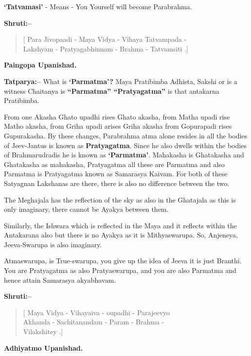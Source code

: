 \textbf{‘Tatvamasi’} - Means - You Yourself will become Parabrahma.

\textbf{Shruti:–}

\begin{verse}
[ Para Jivopaadi - Maya Vidya - Vihaya Tatvampada -\\ Lakshyam - Pratyagabhinnam - Brahma - Tatvamsiti .]
\end{verse}

\begin{flushright}
\textbf{Paingopa Upanishad.}
\end{flushright}

\textbf{Tatparya:–} What is \textbf{‘Parmatma’?} Maya Pratibimba Adhista, Sakshi or is a witness Chaitanya is \textbf{“Parmatma” “Pratyagatma”} is that antakarna Pratibimba.

From one Akasha Ghato upadhi rises Ghato akasha, from Matha upadi rise Matho akasha, from Griha upadi arises Griha akasha from Gopurapadi rises Gupurakasha. By these changes, Parabrahma atma alone resides in all the bodies of Jeev-Jantus is known as \textbf{Pratyagatma}. Since he also dwells within the bodies of Brahmarudradis he is known as \textbf{‘Parmatma’}. Mahakasha is Ghatakasha and Ghatakasha as mahakasha, Pratyagatma all these are Parmatma and also Parmatma is Pratyagatma known as Samarasya Kaivam. For both of these Satyagnan Lakshanas are there, there is also no difference between the two.

The Meghajala has the reflection of the sky as also in the Ghatajala as this is only imaginary, there cannot be Ayakya between them.

Similarly, the Ishwara which is reflected in the Maya and it reflects within the Antakarana also but there is no Ayakya as it is Mithyaswarupa. So, Anjeneya, Jeeva-Swarupa is also imaginary.

Atmaswarupa, is True-swarupa, you give up the idea of Jeeva it is just Branthi. You are Pratyagatma as also Pratyaswarupa, and you are also Parmatma and hence attain Samarasya akyabhavam.

\textbf{Shruti:–}

\begin{verse}
[ Maya Vidya - Vihayaiva - oupadhi - Parajeevyo \\ Akhanda - Sachitanandam - Param - Brahma -\\ Vilakshitey .]
\end{verse}

\begin{flushright}
\textbf{Adhiyatmo Upanishad.}
\end{flushright}


